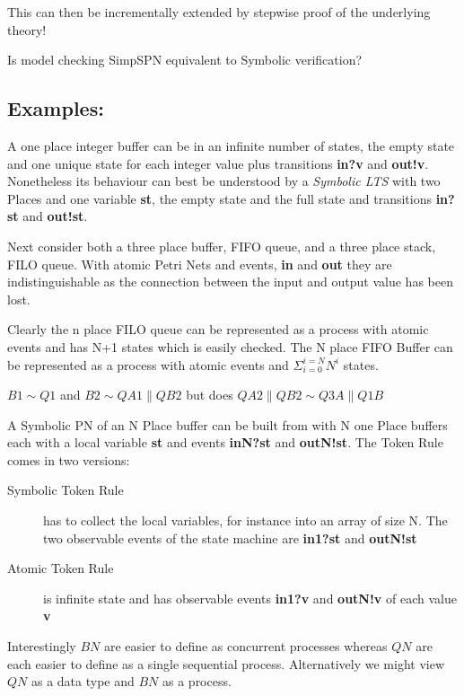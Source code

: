 This can then be incrementally extended by stepwise proof of the underlying theory! 


Is model checking  SimpSPN equivalent to Symbolic verification? 

\subsection{Examples:}

A one place integer buffer can be in an infinite number of states, the empty state and one unique state for each integer value plus  transitions {\bf in?v} and {\bf out!v}. Nonetheless its behaviour can best be understood by a {\it Symbolic LTS} with two Places and one variable {\bf st}, the empty state and the full state and transitions {\bf in?st} and {\bf out!st}.



Next consider both a three place buffer, FIFO queue, and a three place stack, FILO queue. With atomic Petri Nets and events, {\bf in} and {\bf out}  they are indistinguishable as the connection between the input and output value has been lost. 

Clearly the n place FILO queue can be represented as a process with atomic events and has N+1 states which  is easily checked. The N place  FIFO Buffer can be represented as a process with atomic events and $\Sigma^{i = N}_{i =0} N^i$ states.

$B1 \sim  Q1$   and $B2 \sim QA1 \parallel QB2  $  but does $QA2\parallel QB2  \sim Q3A \parallel Q1B$ 

A Symbolic PN of an  N Place buffer can  be built from with N one Place buffers each with a local variable {\bf st} and events {\bf inN?st} and {\bf outN!st}. The Token Rule comes in two versions:
\begin{description}
\item [Symbolic Token Rule] has to collect the local variables, for instance into an array of size N. The two observable events of the state machine are {\bf in1?st} and {\bf outN!st}
\item [Atomic Token Rule] is infinite state and has observable events {\bf in1?v} and {\bf outN!v} of each value {\bf v}
\end{description}  

Interestingly $BN$ are easier to define as concurrent processes whereas $QN$ are each  easier to define as a single sequential process. Alternatively we might view $QN$ as a data type and $BN$ as a process.

